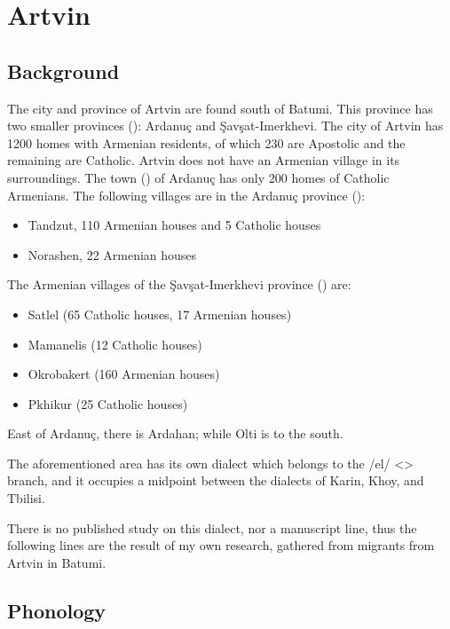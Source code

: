 \chapter{Artvin} \label{chapter:Artvin}
\section{Background}

\begin{adjarianpage}\label{page:291}\end{adjarianpage}%


The city and province of Artvin are found south of Batumi. This province has two smaller provinces (): Ardanuç and  Şavşat-Imerkhevi. The city of Artvin has 1200 homes with Armenian residents, of which 230 are Apostolic and the remaining are Catholic. Artvin does not have an Armenian village in its surroundings. The town () of Ardanuç has only 200 homes of Catholic Armenians. The following villages are in the Ardanuç province ():
\begin{itemize}
	\item Tandzut, 110 Armenian houses and 5 Catholic houses
	\item Norashen, 22 Armenian houses
\end{itemize}

The Armenian villages of the Şavşat-Imerkhevi province () are:
\begin{itemize}
	\item Satlel (65 Catholic houses, 17 Armenian houses)
	\item Mamanelis (12 Catholic houses)
	\item Okrobakert (160 Armenian houses)
	\item Pkhikur (25 Catholic houses)
	
\end{itemize}

East of Ardanuç, there is Ardahan; while Olti is to the south. 

The aforementioned area has its own dialect which belongs to the /el/ <> branch, and it occupies a midpoint between the dialects of Karin, Khoy, and Tbilisi. 

There is no published study on this dialect, nor a manuscript line, thus the following lines are the result of my own research, gathered from migrants from Artvin in Batumi. 

\section{Phonology}
